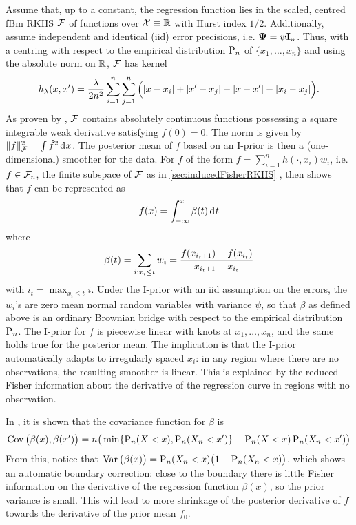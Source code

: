 Assume that, up to a constant, the regression function lies in the scaled, centred fBm RKHS ${\mathcal F}$ of functions over ${\mathcal X} \equiv \mathbb{R}$ with Hurst index $1/2$.
Additionally, assume independent and identical (iid) error precisions, i.e. ${\bm\Psi} = \psi{\mathbf I}_n$.
Thus, with a centring with respect to the empirical distribution $\operatorname{P}_n$ of $\{x_1,\dots,x_n\}$ and using the absolute norm on $\mathbb{R}$, ${\mathcal F}$ has kernel
\[
  h_\lambda(x,x') = \frac{\lambda}{2n^2} \sum_{i=1}^n\sum_{j=1}^n \Big( \lvert x-x_i\rvert + \lvert x'-x_j\rvert - \lvert x-x'\rvert - \lvert x_i-x_j\rvert \Big).
\]
As proven by \citet[Sec. 10]{van2008reproducing}, ${\mathcal F}$ contains absolutely continuous functions possessing a square integrable weak derivative satisfying $f(0)=0$.
The norm is given by $\lVert f\rVert^2_{\mathcal F} = \int \dot f^2 \operatorname{d}\hspace{0.5pt}\! x$.
The posterior mean of $f$ based on an I-prior is then a (one-dimensional) smoother for the data.
For $f$ of the form $f = \sum_{i=1}^n h(\cdot,x_i)w_i$, i.e. $f\in{\mathcal F}_n$, the finite subspace of ${\mathcal F}$ as in \cref{sec:inducedFisherRKHS} , then \citet{bergsma2017} shows that $f$ can be represented as 
\vspace{-0.5em}
\begin{align}\label{eq:ipriorbrownianbridge}
  f(x) = \int_{-\infty}^x \beta(t) \dint t \vspace{-0.5em}
\end{align}
where 
\vspace{-0.5em}
\begin{align}
  \beta(t) = \sum_{i:x_i \leq t} w_i =  \frac{f(x_{i_t + 1}) - f(x_{i_t})}{x_{i_t + 1} - x_{i_t}} \vspace{-0.1em}
\end{align}
with $i_t = \max_{x_i \leq t} i$.
Under the I-prior with an iid assumption on the errors, the $w_i$'s are zero mean normal random variables with variance $\psi$, so that $\beta$ as defined above is an ordinary Brownian bridge with respect to the empirical distribution $\operatorname{P}_n$.
The I-prior for $f$ is piecewise linear with knots at $x_1,\dots,x_n$, and the same holds true for the posterior mean.
The implication is that the I-prior automatically adapts to irregularly spaced $x_i$: in any region where there are no observations, the resulting smoother is linear.
This is explained by the reduced Fisher information about the derivative of the regression curve in regions with no observation.

In \citet{bergsma2017}, it is shown that the covariance function for $\beta$ is 
\[
  \operatorname{Cov}\big(\beta(x),\beta(x') \big) = n \big( \min\{\operatorname{P}_n(X < x), \operatorname{P}_n(X_n < x') \} -  \operatorname{P}_n(X < x) \operatorname{P}_n(X_n < x') \big) 
\]
From this, notice that $\operatorname{Var} \big(\beta(x)\big) = \operatorname{P}_n(X_n < x)\big(1 - \operatorname{P}_n(X_n < x) \big)$, which shows an automatic boundary correction: close to the boundary there is little Fisher information on the derivative of the regression function $\beta(x)$, so the prior variance is small.
This will lead to more shrinkage of the posterior derivative of $f$ towards the derivative of the prior mean $f_0$.

